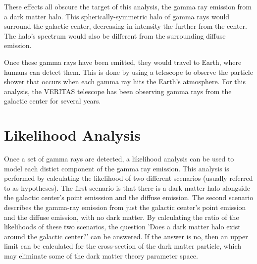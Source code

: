 These effects all obscure the target of this analysis, the gamma ray emission from a dark matter halo.
This spherically-symmetric halo of gamma rays would surround the galactic center, decreasing in intensity the further from the center.
The halo's spectrum would also be different from the surrounding diffuse emission.

Once these gamma rays have been emitted, they would travel to Earth, where humans can detect them.
This is done by using a telescope to observe the particle shower that occurs when each gamma ray hits the Earth's atmosphere.
For this analysis, the VERITAS telescope has been observing gamma rays from the galactic center for several years.

\section{Likelihood Analysis}
Once a set of gamma rays are detected, a likelihood analysis can be used to model each distict component of the gamma ray emission.
This analysis is performed by calculating the likelihood of two different scenarios (usually referred to as hypotheses).
The first scenario is that there is a dark matter halo alongside the galactic center's point emisssion and the diffuse emission.
The second scenario describes the gamma-ray emission from just the galactic center's point emission and the diffuse emission, with no dark matter.
By calculating the ratio of the likelihoods of these two scenarios, the question 'Does a dark matter halo exist around the galactic center?' can be answered.
If the answer is no, then an upper limit can be calculated for the cross-section of the dark matter particle, which may eliminate some of the dark matter theory parameter space.


